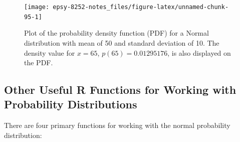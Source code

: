 \documentclass[]{book}
\newenvironment{Shaded}{\begin{snugshade}}{\end{snugshade}}
\newcommand{\CommentTok}[1]{\textcolor[rgb]{0.56,0.35,0.01}{\textit{#1}}}
\newcommand{\DataTypeTok}[1]{\textcolor[rgb]{0.13,0.29,0.53}{#1}}
\newcommand{\DecValTok}[1]{\textcolor[rgb]{0.00,0.00,0.81}{#1}}
\newcommand{\FloatTok}[1]{\textcolor[rgb]{0.00,0.00,0.81}{#1}}
\newcommand{\KeywordTok}[1]{\textcolor[rgb]{0.13,0.29,0.53}{\textbf{#1}}}
\newcommand{\NormalTok}[1]{#1}
\newcommand{\OperatorTok}[1]{\textcolor[rgb]{0.81,0.36,0.00}{\textbf{#1}}}
\newcommand{\StringTok}[1]{\textcolor[rgb]{0.31,0.60,0.02}{#1}}
\begin{document}
\begin{Shaded}
\end{Shaded}

\begin{figure}

{\centering \texttt{[image: epsy-8252-notes\_files/figure-latex/unnamed-chunk-95-1]} 

}

\caption{Plot of the probability density function (PDF) for a Normal distribution with mean of 50 and standard deviation of 10. The density value for $x=65$, $p(65)= 0.01295176$, is also displayed on the PDF.}\label{fig:unnamed-chunk-95}
\end{figure}

\hypertarget{other-useful-r-functions-for-working-with-probability-distributions}{%
\subsection{Other Useful R Functions for Working with Probability Distributions}\label{other-useful-r-functions-for-working-with-probability-distributions}}

There are four primary functions for working with the normal probability distribution:
\end{document}
